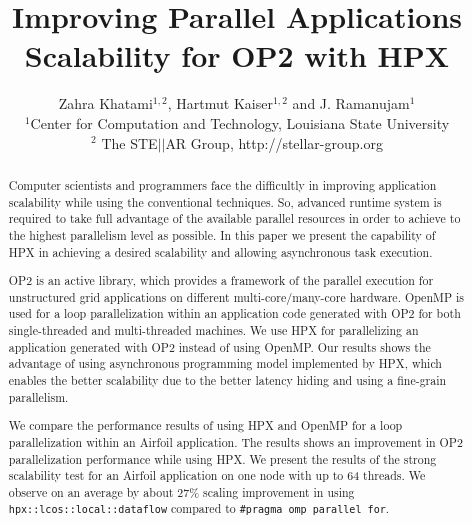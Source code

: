 \documentclass[conference]{IEEEtran}
\begin{document}





%

\title{Improving Parallel Applications Scalability for OP2 with HPX}
\author{Zahra Khatami$^{1,2}$, Hartmut Kaiser$^{1,2}$ and J. Ramanujam$^{1}$ \\$^{1}$Center for Computation and Technology, Louisiana State University\\$^{2}$ The STE$||$AR Group, http://stellar-group.org
}
   
\maketitle

\begin{abstract}

Computer scientists and programmers face the difficultly in improving application scalability while using the conventional techniques. So, advanced runtime system is required to take full advantage of the available parallel resources in order to achieve to the highest parallelism level as possible. In this paper we present the capability of HPX in achieving a desired scalability and allowing asynchronous task execution.

OP2 is an active library, which provides a framework of the parallel execution for unstructured grid applications on different multi-core/many-core hardware.  OpenMP is used for a loop parallelization within an application code generated with OP2 for both single-threaded and multi-threaded machines. We use HPX for parallelizing an application generated with OP2 instead of using OpenMP. Our results shows the advantage of using asynchronous programming model implemented by HPX, which enables the better scalability due to the better latency hiding and using a fine-grain parallelism.

We compare the performance results of using HPX and OpenMP for a loop parallelization within an Airfoil application. The results shows an improvement in OP2 parallelization performance while using HPX. We present the results of the strong scalability test for an Airfoil application on one node with up to 64 threads. We observe on an average by about 27\% scaling improvement in using \texttt{hpx::lcos::local::dataflow} compared to \texttt{\#pragma omp parallel for}. 
\end{abstract}
\end{document}
